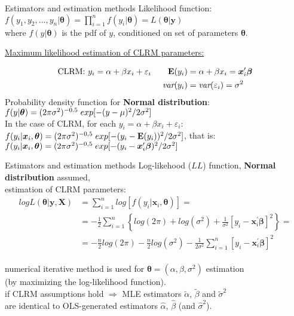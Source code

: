 \documentclass{beamer}
\begin{document}
\begin{frame}{Estimators and estimation methods}
Likelihood function:\\ 
$f(y_1,y_2,\dots,y_n|\bm{\theta}) = \prod_{i=1}^n f(y_i|\bm{\theta}) = L(\bm{\theta}|\bm{y})$ \\
where $f(y|\bm{\theta})$ is the pdf of $y$, conditioned on set of parameters $\bm{\theta}$.\\
\medskip
\centerline{\underline{Maximum likelihood estimation of CLRM parameters:}}
\begin{align*}
\textnormal{CLRM: } y_i= \alpha + \beta x_i + \varepsilon_i \qquad \mathbf{E}(y_i) & =\alpha +\beta x_i = \bm{x}_i^{\prime}\bm{\beta}\\
\textit{var}(y_i) & =\textit{var}(\varepsilon_i)=\sigma^2
\end{align*}
Probability density function for \textbf{Normal distribution}:\\
\medskip
$f(y|\bm{\theta})=(2\pi\sigma^2)^{-0.5} \hspace{0.1cm} exp[-(y-\mu)^2/2\sigma^2]$\\
\bigskip
In the case of CLRM, for each $y_i=\alpha + \beta x_i + \varepsilon_i$: \\
\medskip
$f(y_i| \bm{x}_i,\bm{\theta})=(2\pi\sigma^2)^{-0,5} \hspace{0.1cm} exp[-(y_i-\mathbf{E}(y_i))^2/2\sigma^2]$, that is:\\
$f(y_i| \bm{x}_i,\bm{\theta})=(2\pi\sigma^2)^{-0,5} \hspace{0.1cm} exp[-(y_i-\bm{x}_i^{\prime}\bm{\beta})^2/2\sigma^2]$

\end{frame}
\begin{frame}{Estimators and estimation methods}
Log-likehood ($LL$) function, \textbf{Normal distribution} assumed,\\
estimation of CLRM parameters:\\
\begin{align*}
log L(\bm{\theta}|\bm{y}, \bm{X} ) & =\sum_{i=1}^n log[f(y_i|\bm{x}_i, \bm{\theta})] = \\
& = -\frac{1}{2} \sum_{i=1}^n \left\lbrace { log(2\pi) + log(\sigma^2)+\frac{1}{\sigma^2}[y_i-\bm{x}_i^{\prime}\bm{\beta}]^2} \right\rbrace = \\ 
& = -\frac{n}{2}log(2\pi)-\frac{n}{2}log(\sigma^2)-\frac{1}{2\sigma^2} \sum_{i=1}^n [y_i-\bm{x}_i^{\prime}\bm{\beta}]^2
\end{align*}
\\ \bigskip
numerical iterative method is used for $\bm{\theta}=(\alpha, \beta, \sigma^2)$ estimation\\
(by maximizing the log-likelihood function).\\
if CLRM assumptions hold $\Rightarrow$ MLE estimators $\tilde{\alpha}$, $\tilde{\beta}$ and $\tilde{\sigma}^2$\\ are identical to OLS-generated estimators $\hat{\alpha}$, $\hat{\beta}$ (and $\hat{\sigma}^2$).
\end{frame}
\end{document}
